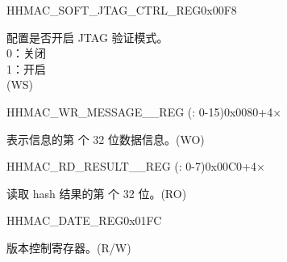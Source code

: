     \begin{register}{H}{HMAC\_SOFT\_JTAG\_CTRL\_REG}{0x00F8}\label{regdesc:HMACSOFTJTAGCTRLREG}
    \regnewline%
    \begin{regdesc}\begin{reglist}
    \label{fielddesc:HMACSOFTJTAGCTRL}\item [HMAC\_SOFT\_JTAG\_CTRL] 配置是否开启 JTAG 验证模式。
    \\0：关闭
    \\1：开启 
    \\ (WS)
    \end{reglist}\end{regdesc}
    \end{register}


    \begin{register}{H}{HMAC\_WR\_MESSAGE\_\_REG (: 0-15)}{0x0080+4×}\label{regdesc:HMACWRMESSAGENREG}
    \regnewline%
    \begin{regdesc}\begin{reglist}
    \label{fielddesc:HMACWDATAN}\item [HMAC\_WDATA\_\regindex{n}] 表示信息的第  个 32 位数据信息。(WO)
    \end{reglist}\end{regdesc}
    \end{register}


    \begin{register}{H}{HMAC\_RD\_RESULT\_\_REG (: 0-7)}{0x00C0+4×}\label{regdesc:HMACRDRESULTNREG}
    \regnewline%
    \begin{regdesc}\begin{reglist}
    \label{fielddesc:HMACRDATAN}\item [HMAC\_RDATA\_\regindex{n}] 读取 hash 结果的第  个 32 位。(RO)
    \end{reglist}\end{regdesc}
    \end{register}

    \begin{register}{H}{HMAC\_DATE\_REG}{0x01FC}\label{regdesc:HMACDATEREG}
    \regnewline%
    \begin{regdesc}\begin{reglist}
    \label{fielddesc:HMACDATE}\item [HMAC\_DATE] 版本控制寄存器。(R/W)
    \end{reglist}\end{regdesc}
    \end{register}
